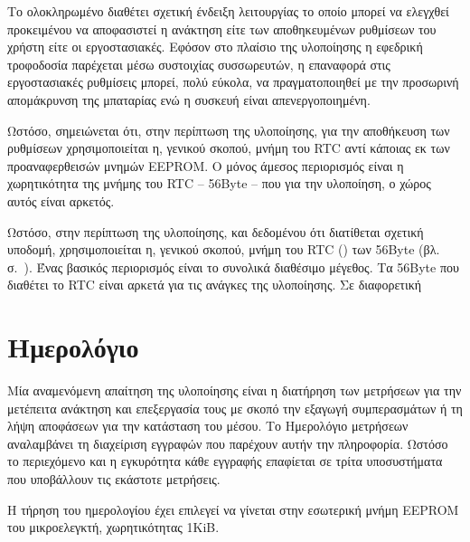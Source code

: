 Το ολοκληρωμένο διαθέτει σχετική ένδειξη λειτουργίας το οποίο μπορεί να ελεγχθεί
προκειμένου να αποφασιστεί η ανάκτηση είτε των αποθηκευμένων ρυθμίσεων του
χρήστη είτε οι εργοστασιακές. Εφόσον στο πλαίσιο της υλοποίησης η εφεδρική
τροφοδοσία παρέχεται μέσω συστοιχίας συσσωρευτών, η επαναφορά στις εργοστασιακές
ρυθμίσεις
μπορεί, πολύ εύκολα, να πραγματοποιηθεί με την προσωρινή απομάκρυνση της
μπαταρίας ενώ η συσκευή είναι απενεργοποιημένη.

Ωστόσο, σημειώνεται ότι, στην περίπτωση της υλοποίησης, για την αποθήκευση των
ρυθμίσεων χρησιμοποιείται η, γενικού σκοπού, μνήμη του RTC αντί κάποιας εκ των
προαναφερθεισών μνημών EEPROM.
Ο μόνος άμεσος περιορισμός είναι η χωρητικότητα της μνήμης του RTC -- 56Byte --
που για την υλοποίηση, ο χώρος αυτός είναι αρκετός.

Ωστόσο, στην περίπτωση της υλοποίησης, και δεδομένου ότι διατίθεται σχετική
υποδομή, χρησιμοποιείται η, γενικού σκοπού, μνήμη του RTC ()
των 56Byte (βλ.  σ.~\pageref{subsec:rtc:user-ram}).
Ένας βασικός περιορισμός είναι το συνολικά διαθέσιμο μέγεθος. Τα 56Byte που
διαθέτει το RTC είναι αρκετά για τις ανάγκες της υλοποίησης. Σε διαφορετική



\section{Ημερολόγιο}
\label{sec:log}

Μία αναμενόμενη απαίτηση της υλοποίησης είναι η διατήρηση των μετρήσεων για την
μετέπειτα ανάκτηση και επεξεργασία τους με σκοπό την εξαγωγή συμπερασμάτων ή τη
λήψη αποφάσεων για την κατάσταση του μέσου. Το Ημερολόγιο μετρήσεων αναλαμβάνει
τη διαχείριση εγγραφών που παρέχουν αυτήν την πληροφορία. Ωστόσο το περιεχόμενο
και η εγκυρότητα κάθε εγγραφής επαφίεται σε τρίτα υποσυστήματα που υποβάλλουν
τις εκάστοτε μετρήσεις.

Η τήρηση του ημερολογίου έχει επιλεγεί να γίνεται στην εσωτερική μνήμη EEPROM
του μικροελεγκτή, χωρητικότητας 1KiB.


%
%

